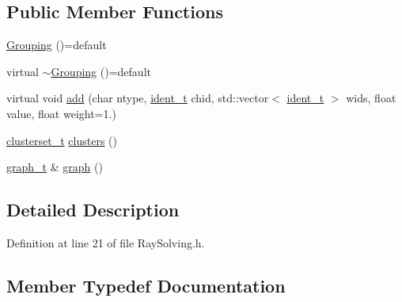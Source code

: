 \subsection*{Public Member Functions}
\begin{DoxyCompactItemize}
\item 
\hyperlink{class_wire_cell_1_1_ray_grid_1_1_grouping_aea24a0adda0b9e0060bdc3b0681745a0}{Grouping} ()=default
\item 
virtual \hyperlink{class_wire_cell_1_1_ray_grid_1_1_grouping_af53fed96735c381bc8725c92e602fa13}{$\sim$\+Grouping} ()=default
\item 
virtual void \hyperlink{class_wire_cell_1_1_ray_grid_1_1_grouping_a7aad92465bc7a1126e9e45997388a77b}{add} (char ntype, \hyperlink{class_wire_cell_1_1_ray_grid_1_1_grouping_aa7b318b7f8e9a48aa15d037bd046a09b}{ident\+\_\+t} chid, std\+::vector$<$ \hyperlink{class_wire_cell_1_1_ray_grid_1_1_grouping_aa7b318b7f8e9a48aa15d037bd046a09b}{ident\+\_\+t} $>$ wids, float value, float weight=1.)
\item 
\hyperlink{class_wire_cell_1_1_ray_grid_1_1_grouping_a0a4ee47c906176803dd7b3e42803d0ed}{clusterset\+\_\+t} \hyperlink{class_wire_cell_1_1_ray_grid_1_1_grouping_a691790f384da883bcfcef022dd075504}{clusters} ()
\item 
\hyperlink{class_wire_cell_1_1_ray_grid_1_1_grouping_a9db75b60d59cf5af39e5957af343b5d7}{graph\+\_\+t} \& \hyperlink{class_wire_cell_1_1_ray_grid_1_1_grouping_a7a0a10096795b1a1f6bc67122d0b34b5}{graph} ()
\end{DoxyCompactItemize}


\subsection{Detailed Description}


Definition at line 21 of file Ray\+Solving.\+h.



\subsection{Member Typedef Documentation}
\mbox{\label{class_wire_cell_1_1_ray_grid_1_1_grouping_a97df53c020a311ad1fccc395195fcd88}} 
